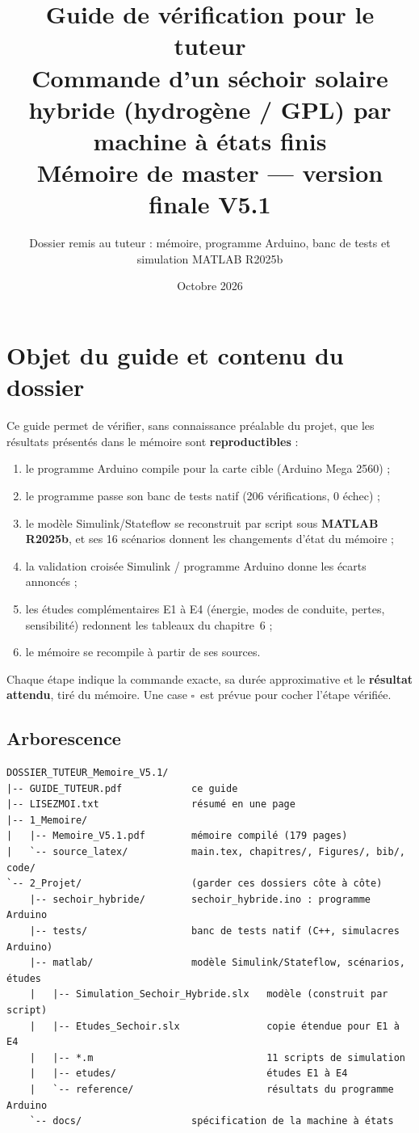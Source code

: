 \documentclass[11pt,a4paper]{article}
\title{\color{bleu}\textbf{Guide de vérification pour le tuteur}\\[4pt]
\large Commande d'un séchoir solaire hybride (hydrogène / GPL) par machine à états finis\\
Mémoire de master --- version finale V5.1}
\author{Dossier remis au tuteur : mémoire, programme Arduino, banc de tests et simulation MATLAB R2025b}
\date{Octobre 2026}
\newcommand{\case}{$\square$\ }
\begin{document}
\maketitle
\tableofcontents
\newpage

\section{Objet du guide et contenu du dossier}

Ce guide permet de vérifier, sans connaissance préalable du projet, que les
résultats présentés dans le mémoire sont \textbf{reproductibles} :
\begin{enumerate}[nosep]
\item le programme Arduino compile pour la carte cible (Arduino Mega 2560) ;
\item le programme passe son banc de tests natif (206 vérifications, 0 échec) ;
\item le modèle Simulink/Stateflow se reconstruit par script sous \textbf{MATLAB R2025b},
  et ses 16 scénarios donnent les changements d'état du mémoire ;
\item la validation croisée Simulink / programme Arduino donne les écarts annoncés ;
\item les études complémentaires E1 à E4 (énergie, modes de conduite, pertes,
  sensibilité) redonnent les tableaux du chapitre~6 ;
\item le mémoire se recompile à partir de ses sources.
\end{enumerate}
Chaque étape indique la commande exacte, sa durée approximative et le
\textbf{résultat attendu}, tiré du mémoire. Une case \case est prévue pour cocher
l'étape vérifiée.

\subsection{Arborescence}

\begin{Verbatim}[frame=single,rulecolor=\color{bleu!40}]
DOSSIER_TUTEUR_Memoire_V5.1/
|-- GUIDE_TUTEUR.pdf            ce guide
|-- LISEZMOI.txt                résumé en une page
|-- 1_Memoire/
|   |-- Memoire_V5.1.pdf        mémoire compilé (179 pages)
|   `-- source_latex/           main.tex, chapitres/, Figures/, bib/, code/
`-- 2_Projet/                   (garder ces dossiers côte à côte)
    |-- sechoir_hybride/        sechoir_hybride.ino : programme Arduino
    |-- tests/                  banc de tests natif (C++, simulacres Arduino)
    |-- matlab/                 modèle Simulink/Stateflow, scénarios, études
    |   |-- Simulation_Sechoir_Hybride.slx   modèle (construit par script)
    |   |-- Etudes_Sechoir.slx               copie étendue pour E1 à E4
    |   |-- *.m                              11 scripts de simulation
    |   |-- etudes/                          études E1 à E4
    |   `-- reference/                       résultats du programme Arduino
    `-- docs/                   spécification de la machine à états
\end{Verbatim}
\end{document}
